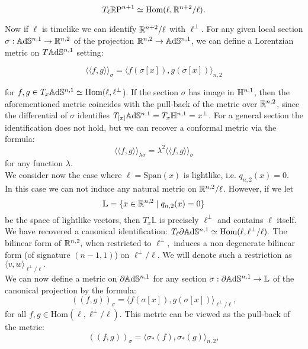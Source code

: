 \[
    T_{\ell}\mathbb{R}\text{P}^{n+1}\simeq \text{Hom}(\ell,\mathbb{R}^{n+2}/\ell). 
\]

Now if $\ell$ is timelike we can identify $\mathbb{R}^{n+2}/\ell$ with $\ell^{\perp}.$ For any given local section $\sigma:\mathbb{A}\mathrm{d}\mathbb{S}^{n,1}\to \mathbb{R}^{n,2}$ of the projection $\mathbb{R}^{n,2}\to \mathbb{A}\mathrm{d}\mathbb{S}^{n,1}$, we can define a Lorentzian metric on $T\mathbb{A}\mathrm{d}\mathbb{S}^{n,1}$ setting:

\[
    \langle \langle f,g \rangle \rangle_{\sigma}=\langle f(\sigma[x]),g(\sigma[x])\rangle_{n,2}
\]

for $f,g\in T_{x}\mathbb{A}\mathrm{d}\mathbb{S}^{n,1}\simeq \text{Hom}(\ell,\ell^\perp$). If the section $\sigma$ has image in $\mathbb{H}^{n,1}$, then the aforementioned metric coincides with the pull-back of the metric over $\mathbb{R}^{n,2}$, since the differential of $\sigma $ identifies $T_{[x]}\mathbb{A}\mathrm{d}\mathbb{S}^{n,1}=T_x\mathbb{H}^{n,1}=x^\perp$. For a general section the identification does not hold, but we can recover a conformal metric via the formula: 
\begin{equation}\label{23}
    \langle \langle f,g \rangle \rangle_{\lambda\sigma}=\lambda^2\langle \langle f,g \rangle \rangle_{\sigma}
\end{equation}
for any function $\lambda$.\\
We consider now the case where $\ell=\text{Span}(x)$ is lightlike, i.e. $q_{n,2}(x)=0$. \\In this case we can not induce any natural metric on $\mathbb{R}^{n,2}/\ell$. However, if we let 
\[
    \mathbb{L}=\{x\in \mathbb{R}^{n,2}\;|\;q_{n,2}(x)=0\}
\]
be the space of lightlike vectors, then $T_x\mathbb{L}$ is precisely $\ell^{\perp}$ and contains $\ell$ itself. We have recovered a canonical identification: $T_\ell\partial\mathbb{A}\mathrm{d}\mathbb{S}^{n,1}\simeq\text{Hom}(\ell,\ell^{\perp }/\ell).$ The bilinear form of $\mathbb{R}^{n,2},$ when restricted to $\ell^{\perp},$ induces a non degenerate bilinear form (of signature $(n-1,1)$) on $\ell^\perp/\ell.$ We will denote such a restriction as $\langle v,w\rangle_{\ell^{\perp}/\ell}.$ \\
We can now define a metric on $\partial\mathbb{A}\mathrm{d}\mathbb{S}^{n,1}$ for any section $\sigma:\partial\mathbb{A}\mathrm{d}\mathbb{S}^{n,1}\to \mathbb{L}$ of the canonical projection by the formula:
\begin{equation}\label{24}
    ((f,g))_{\sigma}=\langle f(\sigma[x]),g(\sigma[x])\rangle_{\ell^{\perp}/\ell},
\end{equation}
for all $f,g\in \text{Hom}(\ell, \ell^\perp/\ell).$ This metric can be viewed as the pull-back of the metric: 
\begin{equation}\label{25}
    ((f,g))_\sigma=\langle \sigma_*(f), \sigma_{\ast} (g)\rangle_{n,2}, 
\end{equation}
